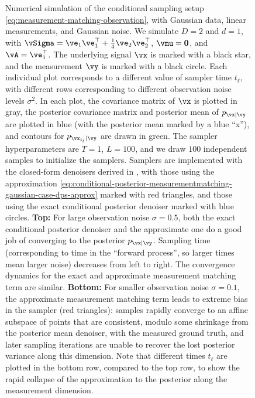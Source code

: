 \documentclass[../../book-main.tex]{subfiles}
\begin{document}
\begin{example}
\begin{figure}[tbp]
    \caption{Numerical simulation of the conditional sampling setup
    \eqref{eq:measurement-matching-observation}, with Gaussian data, linear
    measurements, and Gaussian noise. We simulate $D=2$ and $d=1$, with $\vSigma
    = \ve_1 \ve_1^\top + \tfrac{1}{4} \ve_2 \ve_2^\top$, $\vmu = \Zero$, and
    $\vA = \ve_1^\top$. The underlying signal $\vx$ is marked with a black star,
    and the measurement $\vy$ is marked with a black circle.
    Each individual plot corresponds to a different value of sampler time
    $t_{\ell}$, with different rows corresponding to different observation noise
    levels $\sigma^2$.
    In each plot, the covariance matrix of $\vx$ is plotted in gray, the
    posterior covariance matrix and posterior mean of $p_{\vx \mid \vy}$ are
    plotted in blue (with the posterior mean marked by a blue ``x''), and
    contours for $p_{\vx_{t_{\ell}} \mid \vy}$ are drawn in green. The sampler
    hyperparameters are $T=1$, $L=100$, and we draw $100$
    independent samples to initialize the samplers. Samplers are implemented
    with the closed-form denoisers derived in
    , with those using the
    approximation
    \eqref{eq:conditional-posterior-measurementmatching-gaussian-case-dps-approx}
    marked with red triangles, and those using the exact conditional posterior
    denoiser marked with blue circles.
    \textbf{Top:} For large observation noise $\sigma = 0.5$, both the exact
    conditional posterior denoiser and the approximate one do a good job of
    converging to the posterior $p_{\vx \mid \vy}$. Sampling time (corresponding
    to time in the ``forward process'', so larger times mean larger noise)
    decreases from left to right.  The convergence dynamics for the exact and
    approximate measurement matching term are similar. \textbf{Bottom:} For
    smaller observation noise $\sigma = 0.1$, the
    approximate measurement matching term leads to extreme bias in the sampler
    (red triangles): samples rapidly converge to an affine subspace
    of points that are consistent, modulo some shrinkage from the posterior mean
    denoiser, with the measured ground truth, and later sampling iterations are
    unable to recover the lost posterior variance along this dimension. Note
    that different times $t_{\ell}$ are plotted in the bottom row, compared to
    the top row, to show the rapid collapse of the approximation to the
    posterior along the measurement dimension.}
    \label{fig:conditional_sampling_computational_gaussian}
  \end{figure}


\end{example}
\end{document}
